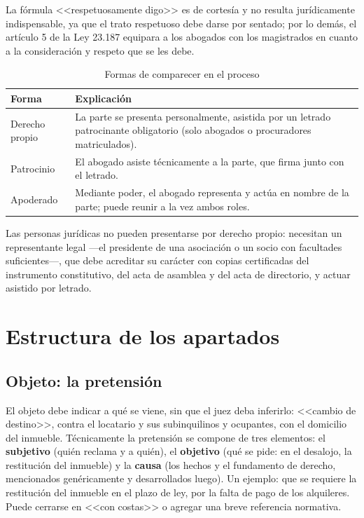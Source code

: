 \documentclass[12pt,oneside]{book}
\begin{document}
La fórmula <<respetuosamente digo>> es de cortesía y no resulta jurídicamente indispensable, ya que el trato respetuoso debe darse por sentado; por lo demás, el artículo 5 de la Ley 23.187 equipara a los abogados con los magistrados en cuanto a la consideración y respeto que se les debe.

\begin{table}[H]
\centering
\caption{Formas de comparecer en el proceso}
\begin{tabularx}{\textwidth}{>{\raggedright\arraybackslash}p{} X}
\toprule
\textbf{Forma} & \textbf{Explicación} \\
\midrule
Derecho propio & La parte se presenta personalmente, asistida por un letrado patrocinante obligatorio (solo abogados o procuradores matriculados). \\
Patrocinio & El abogado asiste técnicamente a la parte, que firma junto con el letrado. \\
Apoderado & Mediante poder, el abogado representa y actúa en nombre de la parte; puede reunir a la vez ambos roles. \\
\bottomrule
\end{tabularx}
\end{table}

Las personas jurídicas no pueden presentarse por derecho propio: necesitan un representante legal ---el presidente de una asociación o un socio con facultades suficientes---, que debe acreditar su carácter con copias certificadas del instrumento constitutivo, del acta de asamblea y del acta de directorio, y actuar asistido por letrado.

\section{Estructura de los apartados}

\subsection{Objeto: la pretensión}

El objeto debe indicar a qué se viene, sin que el juez deba inferirlo: <<cambio de destino>>, contra el locatario y sus subinquilinos y ocupantes, con el domicilio del inmueble. Técnicamente la pretensión se compone de tres elementos: el \textbf{subjetivo} (quién reclama y a quién), el \textbf{objetivo} (qué se pide: en el desalojo, la restitución del inmueble) y la \textbf{causa} (los hechos y el fundamento de derecho, mencionados genéricamente y desarrollados luego). Un ejemplo: que se requiere la restitución del inmueble en el plazo de ley, por la falta de pago de los alquileres. Puede cerrarse en <<con costas>> o agregar una breve referencia normativa.
\end{document}
